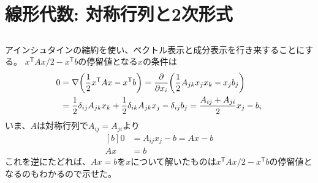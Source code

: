 \documentclass[../ap_2011.tex]{subfiles}
\begin{document}
\setcounter{chapter}{1}
\chapter{線形代数: 対称行列と2次形式}
\section{}
アインシュタインの縮約を使い、ベクトル表示と成分表示を行き来することにする。
\(x^\mathsf{T}Ax/2-x^\mathsf{T}b\)の停留値となる\(x\)の条件は
\begin{equation}\begin{aligned}[b]
    0&=\nabla\qty( \frac{1}{2}x^\mathsf{T}Ax-x^\mathsf{T}b) = \pdv{x_i}\qty(\frac{1}{2}A_{jk}x_jx_k-x_jb_j)\\
    &=\frac{1}{2}\delta_{ij}A_{jk}x_k+\frac{1}{2}\delta_{ik}A_{jk}x_j-\delta_{ij}b_j=\frac{A_{ij}+A_{ji}}{2}x_j-b_i
\end{aligned}\end{equation}
いま、\(A\)は対称行列で\(A_{ij}=A_{ji}\)より
\begin{equation}\begin{aligned}[b]
    0&=A_{ij}x_j-b=Ax-b\\
    Ax &= b
\end{aligned}\end{equation}
これを逆にたどれば、\(Ax=b\)を\(x\)について解いたものは\(x^\mathsf{T}Ax/2-x^\mathsf{T}b\)の停留値となるのもわかるので示せた。
\end{document}
